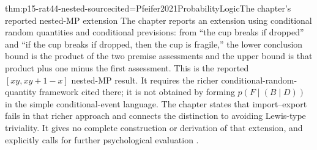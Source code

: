 \begin{hbtheorem}{thm:p15-rat44-nested-source}{cited=Pfeifer2021ProbabilityLogic}{The chapter's reported nested-MP extension}
The chapter reports an extension using conditional random quantities
and conditional previsions: from ``the cup breaks if dropped'' and
``if the cup breaks if dropped, then the cup is fragile,'' the lower
conclusion bound is the product of the two premise assessments and
the upper bound is that product plus one minus the first assessment.
This is the reported \([xy,xy+1-x]\) nested-MP result. It requires
the richer conditional-random-quantity framework cited there; it is
not obtained by forming \(p(F\mid(B\mid D))\) in the simple
conditional-event language. The chapter states that import--export
fails in that richer approach and connects the distinction to avoiding
Lewis-type triviality. It gives no complete construction or derivation
of that extension, and explicitly calls for further psychological
evaluation \cite[p.~282, note~1]{Pfeifer2021ProbabilityLogic}.
\end{hbtheorem}

